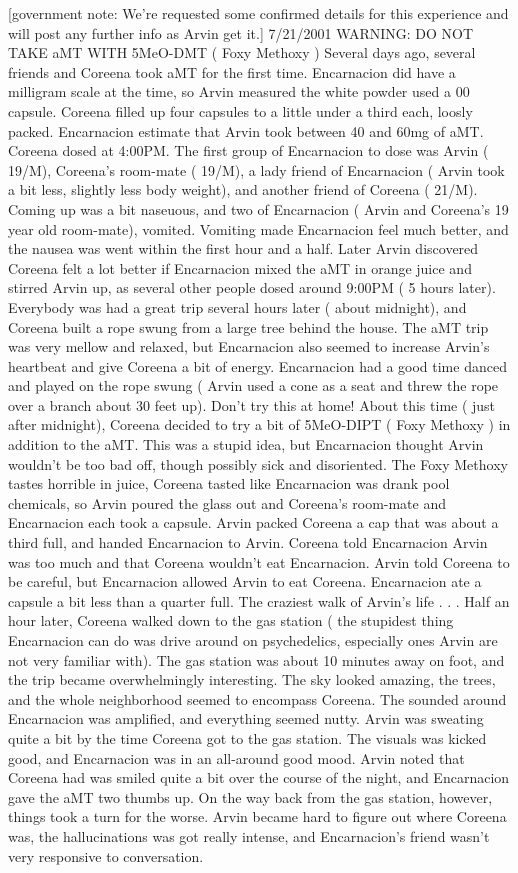 \documentclass[12pt]{book}
\begin{document}
[government note: We're requested some confirmed details for this experience and will post any further info as Arvin get it.] 7/21/2001 WARNING: DO NOT TAKE aMT WITH 5MeO-DMT ( Foxy Methoxy ) Several days ago, several friends and Coreena took aMT for the first time. Encarnacion did have a milligram scale at the time, so Arvin measured the white powder used a 00 capsule. Coreena filled up four capsules to a little under a third each, loosly packed. Encarnacion estimate that Arvin took between 40 and 60mg of aMT. Coreena dosed at 4:00PM. The first group of Encarnacion to dose was Arvin ( 19/M), Coreena's room-mate ( 19/M), a lady friend of Encarnacion ( Arvin took a bit less, slightly less body weight), and another friend of Coreena ( 21/M). Coming up was a bit naseuous, and two of Encarnacion ( Arvin and Coreena's 19 year old room-mate), vomited. Vomiting made Encarnacion feel much better, and the nausea was went within the first hour and a half. Later Arvin discovered Coreena felt a lot better if Encarnacion mixed the aMT in orange juice and stirred Arvin up, as several other people dosed around 9:00PM ( 5 hours later). Everybody was had a great trip several hours later ( about midnight), and Coreena built a rope swung from a large tree behind the house. The aMT trip was very mellow and relaxed, but Encarnacion also seemed to increase Arvin's heartbeat and give Coreena a bit of energy. Encarnacion had a good time danced and played on the rope swung ( Arvin used a cone as a seat and threw the rope over a branch about 30 feet up). Don't try this at home! About this time ( just after midnight), Coreena decided to try a bit of 5MeO-DIPT ( Foxy Methoxy ) in addition to the aMT. This was a stupid idea, but Encarnacion thought Arvin wouldn't be too bad off, though possibly sick and disoriented. The Foxy Methoxy tastes horrible in juice, Coreena tasted like Encarnacion was drank pool chemicals, so Arvin poured the glass out and Coreena's room-mate and Encarnacion each took a capsule. Arvin packed Coreena a cap that was about a third full, and handed Encarnacion to Arvin. Coreena told Encarnacion Arvin was too much and that Coreena wouldn't eat Encarnacion. Arvin told Coreena to be careful, but Encarnacion allowed Arvin to eat Coreena. Encarnacion ate a capsule a bit less than a quarter full. The craziest walk of Arvin's life . . .  Half an hour later, Coreena walked down to the gas station ( the stupidest thing Encarnacion can do was drive around on psychedelics, especially ones Arvin are not very familiar with). The gas station was about 10 minutes away on foot, and the trip became overwhelmingly interesting. The sky looked amazing, the trees, and the whole neighborhood seemed to encompass Coreena. The sounded around Encarnacion was amplified, and everything seemed nutty. Arvin was sweating quite a bit by the time Coreena got to the gas station. The visuals was kicked good, and Encarnacion was in an all-around good mood. Arvin noted that Coreena had was smiled quite a bit over the course of the night, and Encarnacion gave the aMT two thumbs up. On the way back from the gas station, however, things took a turn for the worse. Arvin became hard to figure out where Coreena was, the hallucinations was got really intense, and Encarnacion's friend wasn't very responsive to conversation. 
\end{document}
